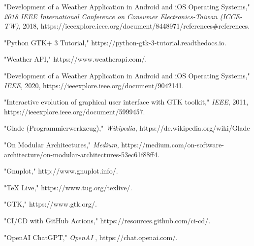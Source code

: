 \documentclass[sn-mathphys-num]{sn-jnl}%
\begin{document}
\begin{thebibliography}{99}

"Development of a Weather Application in Android and iOS Operating Systems," \emph{2018 IEEE International Conference on Consumer Electronics-Taiwan (ICCE-TW)}, 2018, https://ieeexplore.ieee.org/document/8448971/references\#references.

"Python GTK+ 3 Tutorial," https://python-gtk-3-tutorial.readthedocs.io.

"Weather API," https://www.weatherapi.com/.

"Development of a Weather Application in Android and iOS Operating Systems," \emph{IEEE}, 2020, https://ieeexplore.ieee.org/document/9042141.

"Interactive evolution of graphical user interface with GTK toolkit," \emph{IEEE}, 2011, https://ieeexplore.ieee.org/document/5999457.

"Glade (Programmierwerkzeug)," \emph{Wikipedia}, https://de.wikipedia.org/wiki/Glade

"On Modular Architectures," \emph{Medium}, https://medium.com/on-software-architecture/on-modular-architectures-53ec61f88ff4.

"Gnuplot," http://www.gnuplot.info/.

"TeX Live," https://www.tug.org/texlive/.

"GTK," https://www.gtk.org/.

"CI/CD with GitHub Actions," https://resources.github.com/ci-cd/.

"OpenAI ChatGPT," \emph{OpenAI }, https://chat.openai.com/.

\end{thebibliography}

\vspace{108pt}
\end{document}
